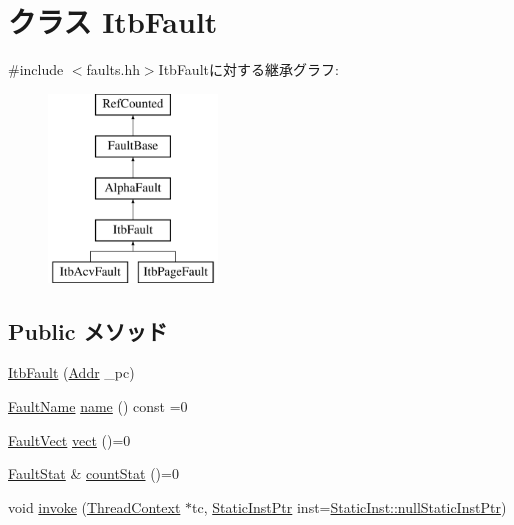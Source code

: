 \hypertarget{classAlphaISA_1_1ItbFault}{
\section{クラス ItbFault}
\label{classAlphaISA_1_1ItbFault}
}


{\ttfamily \#include $<$faults.hh$>$}ItbFaultに対する継承グラフ:\begin{figure}[H]
\begin{center}
\leavevmode
\includegraphics[height=5cm]{classAlphaISA_1_1ItbFault}
\end{center}
\end{figure}
\subsection*{Public メソッド}
\begin{DoxyCompactItemize}
\item 
\hyperlink{classAlphaISA_1_1ItbFault_a03effcae3578d6a5662047858f7c2c86}{ItbFault} (\hyperlink{classm5_1_1params_1_1Addr}{Addr} \_\-pc)
\item 
\hyperlink{sim_2faults_8hh_abb196df64725e5c2568c900cf130d8d7}{FaultName} \hyperlink{classAlphaISA_1_1ItbFault_a09ac100f5ad40cf1726c4e60925c2522}{name} () const =0
\item 
\hyperlink{classm5_1_1params_1_1Addr}{FaultVect} \hyperlink{classAlphaISA_1_1ItbFault_ae7a41506fab06a3c1e392f5286f14c66}{vect} ()=0
\item 
\hyperlink{classStats_1_1Scalar}{FaultStat} \& \hyperlink{classAlphaISA_1_1ItbFault_a4b643982263b390349238a6711216763}{countStat} ()=0
\item 
void \hyperlink{classAlphaISA_1_1ItbFault_a2bd783b42262278d41157d428e1f8d6f}{invoke} (\hyperlink{classThreadContext}{ThreadContext} $\ast$tc, \hyperlink{classRefCountingPtr}{StaticInstPtr} inst=\hyperlink{classStaticInst_aa793d9793af735f09096369fb17567b6}{StaticInst::nullStaticInstPtr})
\end{DoxyCompactItemize}
